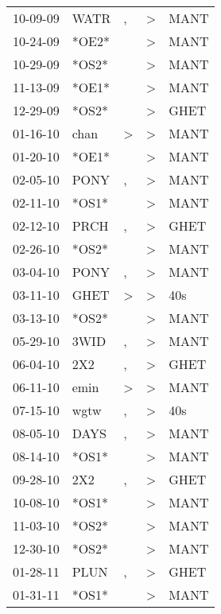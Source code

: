\begin{supertabular}{lllll}
 10-09-09 &   WATR &             , &  \textgreater &  MANT \\
 10-24-09 &  *OE2* &               &  \textgreater &  MANT \\
 10-29-09 &  *OS2* &               &  \textgreater &  MANT \\
 11-13-09 &  *OE1* &               &  \textgreater &  MANT \\
 12-29-09 &  *OS2* &               &  \textgreater &  GHET \\
 01-16-10 &   chan &  \textgreater &  \textgreater &  MANT \\
 01-20-10 &  *OE1* &               &  \textgreater &  MANT \\
 02-05-10 &   PONY &             , &  \textgreater &  MANT \\
 02-11-10 &  *OS1* &               &  \textgreater &  MANT \\
 02-12-10 &   PRCH &             , &  \textgreater &  GHET \\
 02-26-10 &  *OS2* &               &  \textgreater &  MANT \\
 03-04-10 &   PONY &             , &  \textgreater &  MANT \\
 03-11-10 &   GHET &  \textgreater &  \textgreater &   40s \\
 03-13-10 &  *OS2* &               &  \textgreater &  MANT \\
 05-29-10 &   3WID &             , &  \textgreater &  MANT \\
 06-04-10 &    2X2 &             , &  \textgreater &  GHET \\
 06-11-10 &   emin &  \textgreater &  \textgreater &  MANT \\
 07-15-10 &   wgtw &             , &  \textgreater &   40s \\
 08-05-10 &   DAYS &             , &  \textgreater &  MANT \\
 08-14-10 &  *OS1* &               &  \textgreater &  MANT \\
 09-28-10 &    2X2 &             , &  \textgreater &  GHET \\
 10-08-10 &  *OS1* &               &  \textgreater &  MANT \\
 11-03-10 &  *OS2* &               &  \textgreater &  MANT \\
 12-30-10 &  *OS2* &               &  \textgreater &  MANT \\
 01-28-11 &   PLUN &             , &  \textgreater &  GHET \\
 01-31-11 &  *OS1* &               &  \textgreater &  MANT \\

\end{supertabular}
